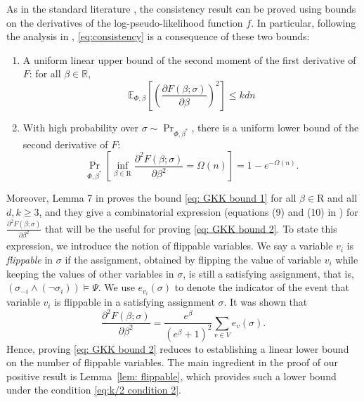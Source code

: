 \documentclass[11pt]{article}
\theoremstyle{definition}
\theoremstyle{remark}
\newcommand{\E}{\mathbb{E}}
\begin{document}
As in the standard literature \cite{Chatterjee07c}, 
the consistency result can be proved using bounds on the derivatives of the log-pseudo-likelihood function $f$.
In particular, following  the analysis in \cite{GKK24}, 
\eqref{eq:consistency} is a consequence of these two bounds:
\begin{enumerate}
    \item A uniform linear upper bound of the second moment of the first derivative of $F$: for all $\beta\in \mathbb{R}$,
    \begin{equation}
        \label{eq: GKK bound 1}
    \E_{\Phi, \beta} \left[
        \left(
            \frac{\partial F(\beta;\sigma)}{\partial \beta}
        \right)^2
        \right] \le kdn
    \end{equation}
    \item 
    With high probability over $\sigma\sim  \Pr_{\Phi, \beta^*}$, 
    there is a uniform lower bound of the second derivative of $F$:
    \begin{equation}
        \label{eq: GKK bound 2}
          \Pr_{\Phi, \beta^*} \left[
          \inf_{\beta\in \mathrm{R}} 
            \frac{\partial^2 F(\beta;\sigma)}{\partial \beta^2}
            = \Omega(n)
          \right] = 1- e^{-\Omega(n)}.
    \end{equation}
\end{enumerate}
Moreover,  Lemma 7 in \cite{GKK24} proves the bound \eqref{eq: GKK bound 1} for all $\beta\in \mathrm{R}$ and all $d,k\ge 3$, and they give a combinatorial expression (equations (9) and (10) in \cite{GKK24}) for $ \frac{\partial^2 F(\beta;\sigma)}{\partial \beta^2}$ that will be the useful for proving \eqref{eq: GKK bound 2}.
To state this expression, we introduce the notion of flippable variables. We say a variable $v_i$ is \emph{flippable} in $\sigma$ if the assignment, obtained by flipping the value of variable $v_i$ while keeping the values of other variables in $\sigma$, is still a satisfying assignment, that is, $(\sigma_{-i} \wedge ( \neg \sigma_i)) \models \Psi$.  
We use
$e_{v_i}(\sigma)$ to denote the indicator of the event that variable $v_i$ is flippable in a satisfying assignment $\sigma$.
It was shown that
\begin{equation}
    \label{eq: GKK bound 3}
      \frac{\partial^2 F(\beta;\sigma)}{\partial \beta^2} = \frac{e^\beta}{(e^\beta+1)^2} \sum_{v\in V} e_v(\sigma).
\end{equation}
Hence, proving \eqref{eq: GKK bound 2} reduces to establishing a linear lower bound on the number of flippable variables. The main 
ingredient in the proof of our positive result
is  Lemma~\ref{lem: flippable}, which provides such a lower bound under the condition \eqref{eq:k/2 condition 2}.
 
\end{document}
